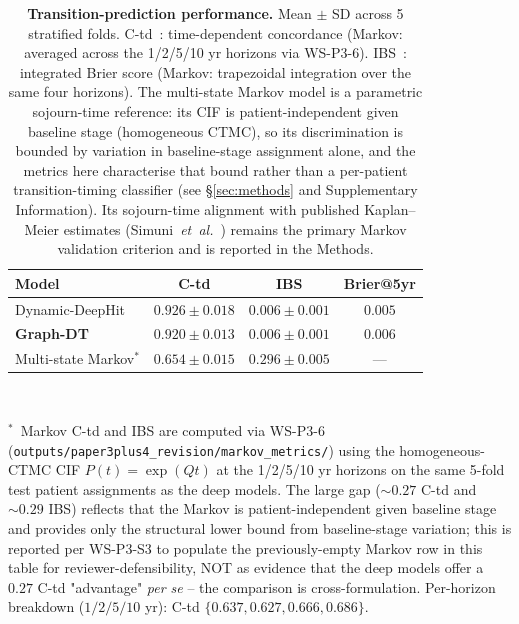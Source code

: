 \documentclass[11pt]{article}
\begin{document}
\begin{table}[!t]
\centering
\caption{\textbf{Transition-prediction performance.} Mean $\pm$ SD across 5 stratified folds. C-td~\cite{uno2007evaluating}: time-dependent concordance (Markov: averaged across the 1/2/5/10 yr horizons via WS-P3-6). IBS~\cite{graf1999brier}: integrated Brier score (Markov: trapezoidal integration over the same four horizons). The multi-state Markov model is a parametric sojourn-time reference: its CIF is patient-independent given baseline stage (homogeneous CTMC), so its discrimination is bounded by variation in baseline-stage assignment alone, and the metrics here characterise that bound rather than a per-patient transition-timing classifier (see \S\ref{sec:methods} and Supplementary Information). Its sojourn-time alignment with published Kaplan--Meier estimates (Simuni~\textit{et~al.}~\cite{simuni2025}) remains the primary Markov validation criterion and is reported in the Methods.}
\label{tab:main}
\begin{tabular}{@{}lccc@{}}
\toprule
\textbf{Model} & \textbf{C-td} & \textbf{IBS} & \textbf{Brier@5yr} \\
\midrule
Dynamic-DeepHit~\cite{lee2018deephit} & $\mathbf{0.926 \pm 0.018}$ & $0.006 \pm 0.001$ & $0.005$ \\
\textbf{Graph-DT} & $0.920 \pm \mathbf{0.013}$ & $0.006 \pm 0.001$ & $0.006$ \\
Multi-state Markov$^{*}$ & $0.654 \pm 0.015$ & $0.296 \pm 0.005$ & --- \\
\bottomrule
\end{tabular}
\\[2pt]
\parbox{\columnwidth}{\scriptsize $^{*}$~Markov C-td and IBS are computed via WS-P3-6 (\texttt{outputs/paper3plus4\_revision/markov\_metrics/}) using the homogeneous-CTMC CIF $P(t){=}\exp(Qt)$ at the 1/2/5/10 yr horizons on the same 5-fold test patient assignments as the deep models. The large gap (${\sim}0.27$ C-td and ${\sim}0.29$ IBS) reflects that the Markov is patient-independent given baseline stage and provides only the structural lower bound from baseline-stage variation; this is reported per WS-P3-S3 to populate the previously-empty Markov row in this table for reviewer-defensibility, NOT as evidence that the deep models offer a $0.27$ C-td "advantage" \emph{per se} -- the comparison is cross-formulation. Per-horizon breakdown ($1/2/5/10$ yr): C-td $\{0.637, 0.627, 0.666, 0.686\}$.}
\end{table}
\end{document}
